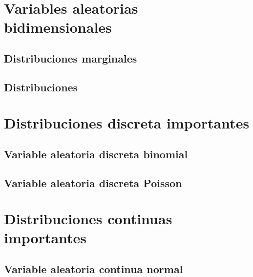 \documentclass[10pt,]{krantz}
\theoremstyle{definition}
\theoremstyle{definition}
\theoremstyle{definition}
\theoremstyle{remark}
\begin{document}
\hypertarget{variables-aleatorias-bidimensionales}{%
\chapter{Variables aleatorias bidimensionales}\label{variables-aleatorias-bidimensionales}}

\hypertarget{distribuciones-marginales}{%
\section{Distribuciones marginales}\label{distribuciones-marginales}}

\hypertarget{distribuciones}{%
\section{Distribuciones}\label{distribuciones}}

\hypertarget{distribuciones-discreta-importantes}{%
\chapter{Distribuciones discreta importantes}\label{distribuciones-discreta-importantes}}

\hypertarget{variable-aleatoria-discreta-binomial}{%
\section{Variable aleatoria discreta binomial}\label{variable-aleatoria-discreta-binomial}}

\hypertarget{variable-aleatoria-discreta-poisson}{%
\section{Variable aleatoria discreta Poisson}\label{variable-aleatoria-discreta-poisson}}

\hypertarget{distribuciones-continuas-importantes}{%
\chapter{Distribuciones continuas importantes}\label{distribuciones-continuas-importantes}}

\hypertarget{variable-aleatoria-continua-normal}{%
\section{Variable aleatoria continua normal}\label{variable-aleatoria-continua-normal}}
\end{document}

